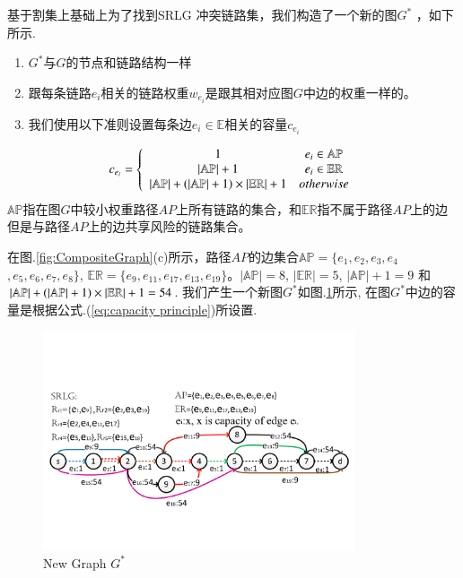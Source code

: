 基于割集上基础上为了找到SRLG 冲突链路集，我们构造了一个新的图$G^*$ ，如下所示.
\begin{enumerate}
  \item $G^*$与$G$的节点和链路结构一样
  \item 跟每条链路$e_i$相关的链路权重$w_{e_i}$是跟其相对应图$G$中边的权重一样的。
  \item 我们使用以下准则设置每条边$e_i \in \mathbb{E}$相关的容量$c_{e_i}$
\end{enumerate}
 \begin{equation}
c_{e_i} = \left\{ {\begin{array}{*{20}{c}}
   1 & {e_i{\rm{ }} \in {\rm{ \mathbb{AP}}}}  \\
   {\left| \mathbb{AP} \right|+1} & {e_i{\rm{ }} \in {\rm{ \mathbb{E}}}{{\rm{\mathbb{R}}}}}  \\
   {\left| {{\rm\mathbb{AP}}} \right| + \left( {\left| {{\rm\mathbb{AP}}} \right| + 1} \right)\times \left| {{\rm{\mathbb{E}}}{{\rm{\mathbb{R}}}}} \right| + 1} & {otherwise}  \\
\end{array}} \right.
\label{eq:capacity principle}
\end{equation}
$\mathbb{AP}$指在图$G$中较小权重路径$AP$上所有链路的集合，和$\mathbb{\mathbb{ER}}$指不属于路径$AP$上的边但是与路径$AP$上的边共享风险的链路集合。

在图.\ref{fig:CompositeGraph}(c)所示，路径$AP$的边集合$\mathbb{AP}=\{e_1,e_2,e_3,e_4$
$,e_5,e_6,e_7,e_8\}$, $\mathbb{\mathbb{ER}}=\{e_9,e_{11},e_{17},e_{13},e_{19}\}$。$|\mathbb{AP}|=8$, $|\mathbb{\mathbb{ER}}|=5$, $|\mathbb{AP}|+1=9$ 和 ${\left| {{\rm{\mathbb{AP}}}} \right| + \left( {\left| {{\rm{\mathbb{AP}}}} \right| + 1} \right)\times \left| {{\rm{\mathbb{E}}}{{\rm{\mathbb{R}}}}} \right| + 1}=54$. 我们产生一个新图$G^*$如图.\ref{fig:FlowStarGraph}所示, 在图$G^*$中边的容量是根据公式.(\ref{eq:capacity principle})所设置.

\begin{figure}[tp]
  \centering
  \includegraphics[width=3.6in]{figures/FlowStarGraph}
  \caption{New Graph $G^*$}\label{fig:FlowStarGraph}
\end{figure}

